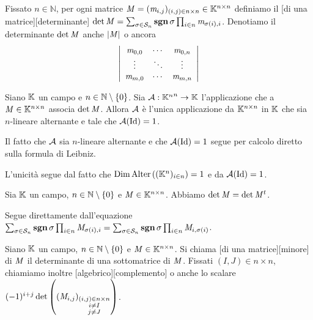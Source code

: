 \begin{Definition}
	Fissato $n \in \mathbb{N}$, per ogni matrice $\mathit{M} = (\mathit{m}_{i,j})_{(i,j) \in n \times n}\in \mathbb{K}^{n \times n}$ definiamo il [di una matrice][determinante] $\Determinant{\Matrix} = \sum_{\Permutation \in \SymmetricGroup{n}} \PermutationSign{\Permutation} \prod_{i \in n} \MatrixElement_{\Permutation(i),i}$. Denotiamo il determinante $\operatorname{det}{\mathit{M}}$ anche $\lvert \mathit{M} \rvert$ o ancora
$$\left \lvert
\begin{array}{ccc}
	\mathit{m}_{0,0}	&	\cdots	&	\mathit{m}_{0,n} \\
	\vdots	&	\ddots	&	\vdots \\
	\mathit{m}_{m,0}	&	\cdots	&	\mathit{m}_{m,n}
\end{array}
\right \rvert$$ 
\end{Definition}
\begin{Theorem}
	Siano $\mathbb{K}$ un campo e $n \in \mathbb{N} \setminus \lbrace 0 \rbrace$. Sia $\mathcal{A}: {\mathbb{K}^n}^n \rightarrow \mathbb{K}$ l'applicazione che a $\mathit{M} \in \mathbb{K}^{n \times n}$ associa $\operatorname{det}{\mathit{M}}$. Allora $\mathcal{A}$ \`e l'unica applicazione da $\mathbb{K}^{n \times n}$ in $\mathbb{K}$ che sia $n$-lineare alternante e tale che $\AlternatingForm(\Identity) = 1$.
\end{Theorem}
\Proof Il fatto che $\mathcal{A}$ sia $n$-lineare alternante e che $\AlternatingForm(\Identity) = 1$ segue per calcolo diretto sulla formula di Leibniz.
\par L'unicit\`a segue dal fatto che $\operatorname{\operatorname{Dim}}{\text{Alter} \left ( (\mathbb{K}^n)_{i \in n} \right )} = 1$ e da $\AlternatingForm(\Identity) = 1$. \EndProof
\begin{Theorem}
	Sia $\mathbb{K}$ un campo, $n \in \mathbb{N} \setminus \lbrace 0 \rbrace$ e $\mathit{M} \in \mathbb{K}^{n \times n}$. Abbiamo $\operatorname{det}{\mathit{M}} = \operatorname{det}{{\mathit{M}}^t}$.
\end{Theorem}
\Proof Segue direttamente dall'equazione $\sum_{\Permutation \in \SymmetricGroup{n}} \PermutationSign{\Permutation} \prod_{i \in n} \Matrix_{\Permutation(i),i} = \sum_{\Permutation \in \SymmetricGroup{n}} \PermutationSign{\Permutation} \prod_{i \in n} \Matrix_{i,\Permutation(i)}$. \EndProof
\begin{Definition}
	Siano $\mathbb{K}$ un campo, $n \in \mathbb{N} \setminus \lbrace 0 \rbrace$ e $\mathit{M} \in \mathbb{K}^{n \times n}$. Si chiama [di una matrice][minore] di $\mathit{M}$ il determinante di una sottomatrice di $\mathit{M}$. Fissati $(I,J) \in n \times n$, chiamiamo inoltre [algebrico][complemento] o anche  lo scalare $(-1)^{i + j} \operatorname{det} \left ( (\mathit{M}_{i,j})_{\substack{(i,j) \in n \times n\\i \neq I\\j \neq J}} \right )$.
\end{Definition}
